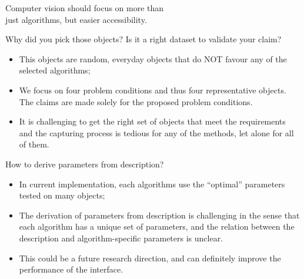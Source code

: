 \documentclass[10pt]{beamer}
\begin{document}
\begin{frame}[standout]

Computer vision should focus on more than \\just algorithms, but easier accessibility.

\end{frame}

\appendix
\begin{frame}

\begin{alertblock}{Why did you pick those objects? Is it a right dataset to validate your claim?}
\begin{itemize}
\item This objects are random, everyday objects that do NOT favour any of the selected algorithms;
\item We focus on four problem conditions and thus four representative objects. The claims are made solely for the proposed problem conditions.
\item It is challenging to get the right set of objects that meet the requirements and the capturing process is tedious for any of the methods, let alone for all of them.
\end{itemize}
\end{alertblock}

\end{frame}

\begin{frame}

\begin{alertblock}{How to derive parameters from description?}
\begin{itemize}
\item In current implementation, each algorithms use the ``optimal'' parameters tested on many objects;
\item The derivation of parameters from description is challenging in the sense that each algorithm has a unique set of parameters, and the relation between the description and algorithm-specific parameters is unclear.
\item This could be a future research direction, and can definitely improve the performance of the interface.
\end{itemize}
\end{alertblock}

\end{frame}
\end{document}
